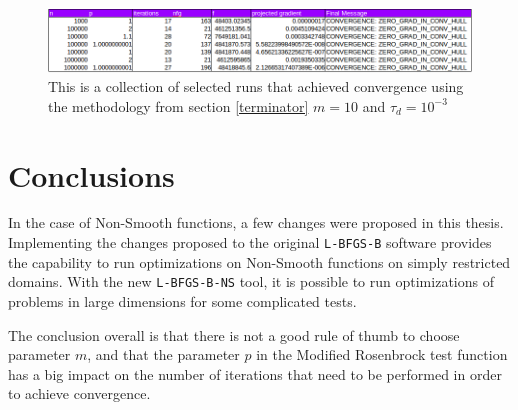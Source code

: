 \begin{figure}
\begin{center}
\includegraphics[scale=0.50]{Figures/SelectedRuns.png}
\caption[Selected Runs changing dimensions using $m$ = 10]{This is a collection of selected runs that achieved convergence using the methodology from section \eqref{terminator} $m = 10$ and $\tau_d = 10^{-3}$}
\label{sel}
\end{center}
\end{figure}


\chapter{Conclusions}
In the case of Non-Smooth functions, a few changes were proposed in this thesis. Implementing the changes proposed to the original \texttt{L-BFGS-B} software provides the capability to run optimizations on Non-Smooth functions on simply restricted domains. With the new \texttt{L-BFGS-B-NS} tool, it is possible to run optimizations of problems in large dimensions for some complicated tests.

The conclusion overall is that there is not a good rule of thumb to choose parameter $m$, and that the parameter $p$ in the Modified Rosenbrock test function has a big impact on the number of iterations that need to be performed in order to achieve convergence.
